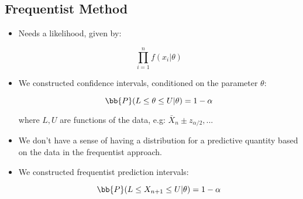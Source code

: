 \documentclass[a4paper]{article}
\begin{document}
        \subsection*{Frequentist Method}
            \begin{itemize}
                \item Needs a likelihood, given by:

                    $$
                        \prod_{i=1}^n f(x_i | \theta)
                    $$

                \item We constructed confidence intervals, conditioned on the
                    parameter $\theta$:

                    $$
                        \bb{P}(L \leq \theta \leq U | \theta) = 1 - \alpha
                    $$

                    where $L, U$ are functions of the data, e.g: $\bar X_n \pm
                    z_{\alpha/2}, ...$

                \item We don't have a sense of having a distribution for a
                    predictive quantity based on the data in the frequentist
                    approach.

                \item We constructed frequentist prediction intervals:

                    $$
                        \bb{P}(L \leq X_{n+1} \leq U | \theta) = 1 - \alpha
                    $$
            \end{itemize}
\end{document}
